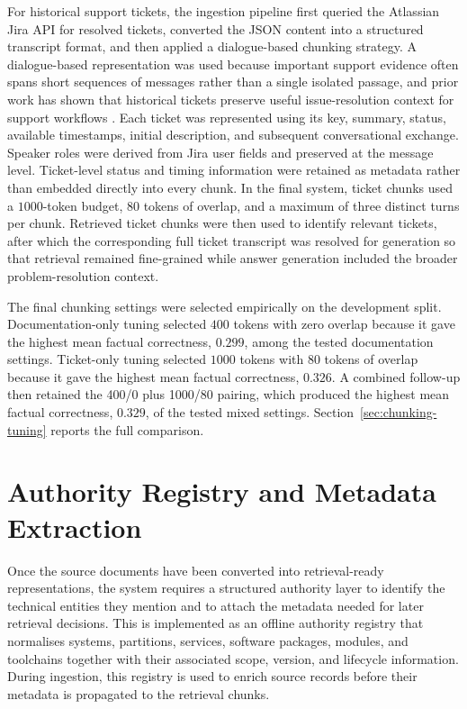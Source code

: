 For historical support tickets, the ingestion pipeline first queried the Atlassian Jira API for resolved tickets, converted the JSON content into a structured transcript format, and then applied a dialogue-based chunking strategy. A dialogue-based representation was used because important support evidence often spans short sequences of messages rather than a single isolated passage, and prior work has shown that historical tickets preserve useful issue-resolution context for support workflows \citep{rodenbeckTicketHubEnablingActionable2023,joslinGeneratingFrequentlyAsked2025}. Each ticket was represented using its key, summary, status, available timestamps, initial description, and subsequent conversational exchange. Speaker roles were derived from Jira user fields and preserved at the message level. Ticket-level status and timing information were retained as metadata rather than embedded directly into every chunk. In the final system, ticket chunks used a $1000$-token budget, $80$ tokens of overlap, and a maximum of three distinct turns per chunk. Retrieved ticket chunks were then used to identify relevant tickets, after which the corresponding full ticket transcript was resolved for generation so that retrieval remained fine-grained while answer generation included the broader problem-resolution context. 

The final chunking settings were selected empirically on the development split. Documentation-only tuning selected $400$ tokens with zero overlap because it gave the highest mean factual correctness, $0.299$, among the tested documentation settings. Ticket-only tuning selected $1000$ tokens with $80$ tokens of overlap because it gave the highest mean factual correctness, $0.326$. A combined follow-up then retained the 400/0 plus 1000/80 pairing, which produced the highest mean factual correctness, $0.329$, of the tested mixed settings. Section~\ref{sec:chunking-tuning} reports the full comparison. 

\section{Authority Registry and Metadata Extraction}
\label{sec:authority-registry-metadata-extraction}

Once the source documents have been converted into retrieval-ready representations, the system requires a structured authority layer to identify the technical entities they mention and to attach the metadata needed for later retrieval decisions. This is implemented as an offline authority registry that normalises systems, partitions, services, software packages, modules, and toolchains together with their associated scope, version, and lifecycle information. During ingestion, this registry is used to enrich source records before their metadata is propagated to the retrieval chunks. 

